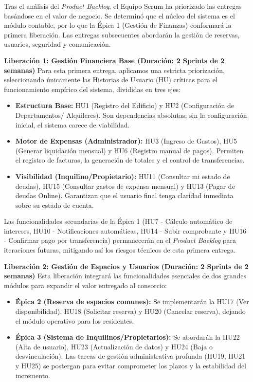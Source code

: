 Tras el análisis del \textit{Product Backlog}, el Equipo Scrum ha priorizado las entregas basándose en el valor de negocio. Se determinó que el núcleo del sistema es el módulo contable, por lo que la Épica 1 (Gestión de Finanzas) conformará la primera liberación. Las entregas subsecuentes abordarán la gestión de reservas, usuarios, seguridad y comunicación.  

\textbf{Liberación 1: Gestión Financiera Base (Duración: 2 Sprints de 2 semanas)}
Para esta primera entrega, aplicamos una estricta priorización, seleccionando únicamente las Historias de Usuario (HU) críticas para el funcionamiento empírico del sistema, divididas en tres ejes:
\begin{itemize}
    \item \textbf{Estructura Base:} HU1 (Registro del Edificio) y HU2 (Configuración de Departamentos/ Alquileres). Son dependencias absolutas; sin la configuración inicial, el sistema carece de viabilidad.
    \item \textbf{Motor de Expensas (Administrador):} HU3 (Ingreso de Gastos), HU5 (Generar liquidación mensual) y HU6 (Registro manual de pagos). Permiten el registro de facturas, la generación de totales y el control de transferencias.  
    \item \textbf{Visibilidad (Inquilino/Propietario):} HU11 (Consultar mi estado de deudas), HU15 (Consultar gastos de expensa mensual) y HU13 (Pagar de deudas Online). Garantizan que el usuario final tenga claridad inmediata sobre su estado de cuenta.
\end{itemize}

Las funcionalidades secundarias de la Épica 1 (HU7 - Cálculo automático de intereses, HU10 - Notificaciones automáticas, HU14 - Subir comprobante y HU16 - Confirmar pago por transferencia) permanecerán en el \textit{Product Backlog} para iteraciones futuras, mitigando así los riesgos técnicos de esta primera entrega.  

\textbf{Liberación 2: Gestión de Espacios y Usuarios (Duración: 2 Sprints de 2 semanas)}
Esta liberación integrará las funcionalidades esenciales de dos grandes módulos para expandir el valor entregado al consorcio:
\begin{itemize}
    \item \textbf{Épica 2 (Reserva de espacios comunes):} Se implementarán la HU17 (Ver disponibilidad), HU18 (Solicitar reserva) y HU20 (Cancelar reserva), dejando el módulo operativo para los residentes.  
    \item \textbf{Épica 3 (Sistema de Inquilinos/Propietarios):} Se abordarán la HU22 (Alta de usuario), HU23 (Actualización de datos) y HU24 (Baja o desvinculación). Las tareas de gestión administrativa profunda (HU19, HU21 y HU25) se postergan para evitar comprometer los plazos y la estabilidad del incremento.
\end{itemize}


